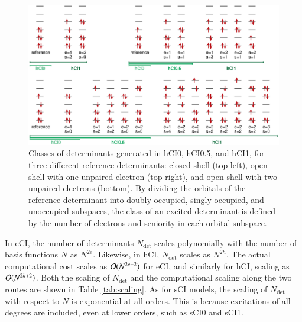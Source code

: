 \documentclass[aip,jcp,reprint,noshowkeys,superscriptaddress]{revtex4-1}
\newcommand{\Ndet}{N_\text{det}}
\begin{document}
\begin{figure}%
\includegraphics[width=1.0\linewidth]{determinants}
\caption{Classes of determinants generated in hCI0, hCI0.5, and hCI1, for three different reference determinants:
closed-shell (top left), open-shell with one unpaired electron (top right), and open-shell with two unpaired electrons (bottom).
By dividing the orbitals of the reference determinant into doubly-occupied, singly-occupied, and unoccupied subspaces,
the class of an excited determinant is defined by the number of electrons and seniority in each orbital subspace.}
\label{fig:determinants}
\end{figure}

In eCI, the number of determinants $\Ndet$ scales polynomially with the number of basis functions $N$ as $N^{2e}$. \cite{SzaboBook}
Likewise, in hCI, $\Ndet$ scales as $N^{2h}$.
The actual computational cost scales as $\order*{N^{2e+2}}$ for eCI, and similarly for hCI, scaling as $\order*{N^{2h+2}}$.
Both the scaling of $\Ndet$ and the computational scaling along the two routes are shown in Table \ref{tab:scaling}.
As for sCI models, the scaling of $\Ndet$ with respect to $N$ is exponential at all orders. \cite{Bytautas_2011,Allen_1962,Smith_1965,Veillard_1967}
This is because excitations of all degrees are included, even at lower orders, such as sCI0 and sCI1.
\end{document}
